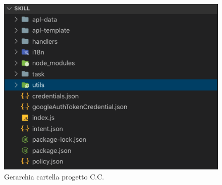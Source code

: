 \begin{figure}[H]
	\includegraphics[width=13cm]{immagini/skill-folder.png}
	\caption{\label{fig:gerarchia_cartella_cc}Gerarchia cartella progetto C.C.}
\end{figure}

